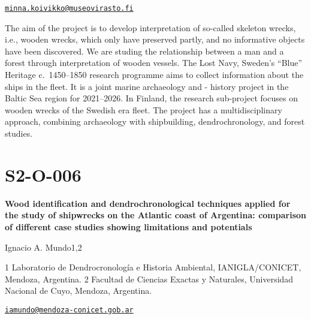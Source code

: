 \documentclass[
]{book}
\begin{document}
\href{mailto:minna.koivikko@museovirasto.fi}{\nolinkurl{minna.koivikko@museovirasto.fi}}

The aim of the project is to develop interpretation of so-called skeleton wrecks, i.e., wooden wrecks, which only have preserved partly, and no informative objects have been discovered. We are studing the relationship between a man and a forest through interpretation of wooden vessels. The Lost Navy, Sweden's ``Blue'' Heritage c.~1450--1850 research programme aims to collect information about the ships in the fleet. It is a joint marine archaeology and - history project in the Baltic Sea region for 2021--2026. In Finland, the research sub-project focuses on wooden wrecks of the Swedish era fleet. The project has a multidisciplinary approach, combining archaeology with shipbuilding, dendrochronology, and forest studies.

\hypertarget{s2-o-006}{%
\section*{S2-O-006}\label{s2-o-006}}

\textbf{Wood identification and dendrochronological techniques applied for the study of shipwrecks on the Atlantic coast of Argentina: comparison of different case studies showing limitations and potentials}

Ignacio A. Mundo1,2

1 Laboratorio de Dendrocronología e Historia Ambiental, IANIGLA/CONICET, Mendoza, Argentina. 2 Facultad de Ciencias Exactas y Naturales, Universidad Nacional de Cuyo, Mendoza, Argentina.

\href{mailto:iamundo@mendoza-conicet.gob.ar}{\nolinkurl{iamundo@mendoza-conicet.gob.ar}}
\end{document}

